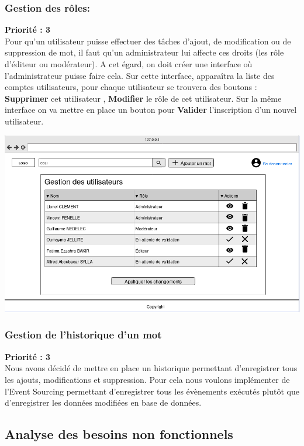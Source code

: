 \documentclass[12pt,a4paper]{article}
\begin{document}
\subsubsection{Gestion des rôles:}
 \textbf{Priorité : 3} \\
Pour qu'un utilisateur puisse effectuer des tâches d'ajout, de modification ou de suppression de mot, il faut qu'un administrateur lui affecte ces droits (les rôle d'éditeur ou modérateur). A cet égard, on doit créer une interface où l'administrateur puisse faire cela.
Sur cette interface, apparaîtra la liste des comptes utilisateurs, pour chaque utilisateur se trouvera des boutons  : \textbf{Supprimer} cet utilisateur ,\textbf{ Modifier} le rôle de cet utilisateur. 
Sur la même interface on va mettre en place un bouton pour \textbf{Valider} l'inscription d'un nouvel utilisateur.
\begin{center}\includegraphics[width=150mm]{img/user_screen.png}\end{center}



\subsubsection{Gestion de l'historique d'un mot}
 \textbf{Priorité : 3} \\
Nous avons décidé de mettre en place un historique permettant d'enregistrer tous les ajouts, modifications et suppression. Pour cela nous voulons implémenter de l'Event Sourcing permettant d'enregistrer tous les évènements exécutés plutôt que d'enregistrer les données modifiées en base de données.
\subsection{Analyse des besoins non fonctionnels}
\smallbreak
\end{document}
